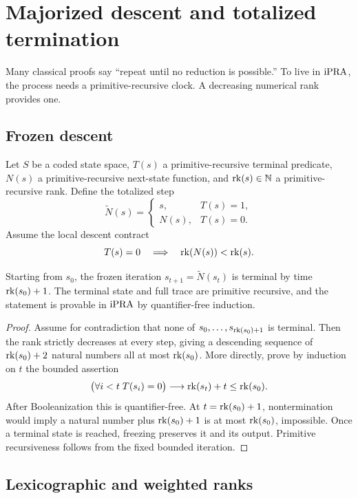 \section{Majorized descent and totalized termination}
\label{sec:descent}

Many classical proofs say ``repeat until no reduction is possible.''  To live in
\(\mathrm{iPRA}\), the process needs a primitive-recursive clock.  A decreasing numerical rank
provides one.

\subsection{Frozen descent}

Let \(S\) be a coded state space, \(T(s)\) a primitive-recursive terminal predicate,
\(N(s)\) a primitive-recursive next-state function, and
\(\operatorname{rk}(s)\in\mathbb N\) a primitive-recursive rank.  Define the totalized step
\[
  \widetilde N(s)=
  \begin{cases}
    s,&T(s)=1,\\
    N(s),&T(s)=0.
  \end{cases}
\]
Assume the local descent contract
\[
  T(s)=0\quad\Longrightarrow\quad \operatorname{rk}(N(s))<\operatorname{rk}(s).
\]

\begin{theorem}
\label{thm:majorized-descent}
Starting from \(s_0\), the frozen iteration
\(s_{t+1}=\widetilde N(s_t)\) is terminal by time \(\operatorname{rk}(s_0)+1\).  The terminal state
and full trace are primitive recursive, and the statement is provable in \(\mathrm{iPRA}\) by
quantifier-free induction.
\end{theorem}

\begin{proof}
Assume for contradiction that none of
\(s_0,\ldots,s_{\operatorname{rk}(s_0)+1}\) is terminal.  Then the rank strictly decreases at every
step, giving a descending sequence of \(\operatorname{rk}(s_0)+2\) natural numbers all at most
\(\operatorname{rk}(s_0)\).  More directly, prove by induction on \(t\) the bounded assertion
\[
  \bigl(\forall i<t\;T(s_i)=0\bigr)
  \longrightarrow
  \operatorname{rk}(s_t)+t\le\operatorname{rk}(s_0).
\]
After Booleanization this is quantifier-free.  At
\(t=\operatorname{rk}(s_0)+1\), nontermination would imply a natural number plus
\(\operatorname{rk}(s_0)+1\) is at most \(\operatorname{rk}(s_0)\), impossible.  Once a terminal state is
reached, freezing preserves it and its output.  Primitive recursiveness follows from
the fixed bounded iteration.
\end{proof}

\subsection{Lexicographic and weighted ranks}

